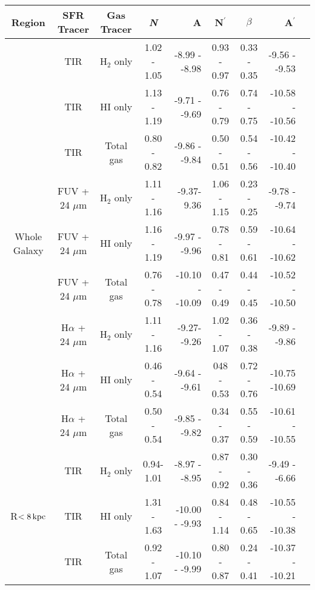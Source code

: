 \documentclass[useAMS,usenatbib]{mn2e}
\newcommand \kpc        {\,{\rm kpc}}
\newcommand \nprime {N$^\prime$}
\begin{document}
\begin{table*}
\caption{Fitting parameters of the SF laws from applying the Bayesian method, {\it N} is the power index of the K-S law; A is the intercept of the K-S law; \nprime is the gas power index in the extended Schmidt law; $\beta$ is the power index of the stellar component in the extended Schmidt law; and A$^\prime$ is the intercept of the extended Schmidt law}
\label{table:res}
\begin{tabular}{ccccrccrr}
\hline\hline
\multicolumn{1}{c}{\multirow{1}{*}{Region}} & SFR Tracer & Gas Tracer & {\it N}    & A      & \nprime & $\beta$ & A$^\prime$ \\
\hline
\multicolumn{1}{c}{\multirow{9}{*}{Whole Galaxy}} & TIR  & H$_2$ only & 1.02 - 1.05 & -8.99 - -8.98  & 0.93 - 0.97    & 0.33 - 0.35    & -9.56 - -9.53  \\
 & TIR               & HI only    & 1.13 - 1.19 & -9.71 - -9.69  & 0.76 - 0.79    & 0.74 - 0.75    & -10.58 - -10.56     \\
 & TIR               & Total gas  & 0.80 - 0.82 & -9.86 - -9.84  & 0.50 - 0.51    & 0.54 - 0.56    & -10.42 - -10.40     \\
 & FUV + 24 $\mu$m       & H$_2$ only & 1.11 - 1.16 & -9.37-9.36  & 1.06 - 1.15   & 0.23 - 0.25    & -9.78 - -9.74      \\
 & FUV + 24 $\mu$m       & HI only    & 1.16 - 1.19 & -9.97 - -9.96  & 0.78 - 0.81    & 0.59 - 0.61   & -10.64 - -10.62     \\
 & FUV + 24 $\mu$m       & Total gas  & 0.76 - 0.78 & -10.10 - -10.09 & 0.47 - 0.49    & 0.44 - 0.45    & -10.52 - -10.50     \\
 & H$\alpha$ + 24 $\mu$m & H$_2$ only & 1.11 - 1.16 & -9.27- -9.26  & 1.02 - 1.07    & 0.36 - 0.38    & -9.89 - -9.86      \\
 & H$\alpha$ + 24 $\mu$m & HI only    & 0.46 - 0.54 & -9.64 - -9.61  & 048 - 0.53    & 0.72 - 0.76    & -10.75 -10.69     \\
 & H$\alpha$ + 24 $\mu$m & Total gas  & 0.50 - 0.54 & -9.85 - -9.82  & 0.34 - 0.37    & 0.55 - 0.59    & -10.61 - -10.55     \\
\hline
\multicolumn{1}{c}{\multirow{9}{*}{R$< 8\kpc$}} & TIR & H$_2$ only & 0.94-1.01 & -8.97 - -8.95  & 0.87 - 0.92    & 0.30 - 0.36    & -9.49 - -6.66 \\
 & TIR               & HI only    & 1.31 - 1.63 & -10.00 - -9.93  & 0.84 - 1.14    & 0.48 - 0.65    & -10.55 - -10.38     \\
 & TIR               & Total gas  & 0.92 - 1.07 & -10.10 - -9.99  & 0.80 - 0.87    & 0.24 - 0.41    & -10.37 - -10.21     \\

\end{tabular}
\end{table*}
\end{document}
